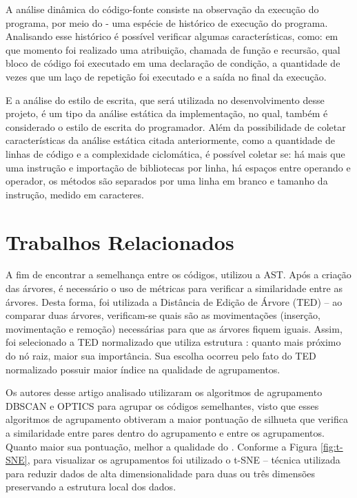		A análise dinâmica do código-fonte consiste na observação da execução do programa,
		por meio do  - uma espécie de histórico de execução do programa. Analisando
		esse histórico é possível verificar algumas características, como: em que momento foi
		realizado uma atribuição, chamada de função e recursão, qual bloco de código foi
		executado em uma declaração de condição, a quantidade de vezes que um laço de repetição
		foi executado e a saída no final da execução.
		
		E a análise do estilo de escrita, que será utilizada no desenvolvimento desse projeto,
		é um tipo da análise estática da implementação, no qual, também é considerado o estilo de
		escrita do programador. Além da possibilidade de coletar características da análise
		estática citada anteriormente, como a quantidade de linhas de código e a complexidade
		ciclomática, é possível coletar se: há mais que uma instrução e importação de bibliotecas
		por linha, há espaços entre operando e operador, os métodos são separados por uma linha
		em branco e tamanho da instrução, medido em caracteres.

	\section{Trabalhos Relacionados}
	\label{sec:TrabRel}
	
	    A fim de encontrar a semelhança entre os códigos, 
	    utilizou a AST. Após a criação das árvores,
	    é necessário o uso de métricas para verificar a similaridade entre as árvores.
	    Desta forma, foi utilizada a Distância de Edição de Árvore (TED) – ao comparar
	    duas árvores, verificam-se quais são as movimentações (inserção, movimentação
	    e remoção) necessárias para que as árvores fiquem iguais. Assim, foi
	    selecionado a TED normalizado que utiliza estrutura :
	    quanto mais próximo do nó raiz, maior sua importância. Sua escolha ocorreu
	    pelo fato do TED normalizado possuir maior índice na qualidade de agrupamentos.
	    
	    Os autores desse artigo analisado utilizaram os algoritmos de agrupamento
	    DBSCAN \cite{Ester1996} e OPTICS \cite{Ankerst1999} para agrupar os códigos
	    semelhantes, visto que esses algoritmos de agrupamento obtiveram a maior
	    pontuação de silhueta que verifica a similaridade entre pares dentro do
	    agrupamento e entre os agrupamentos. Quanto maior sua pontuação, melhor a
	    qualidade do . Conforme a Figura \ref{fig:t-SNE}, para
	    visualizar os agrupamentos foi utilizado o t-SNE \cite{maaten2008} – técnica
	    utilizada para reduzir dados de alta dimensionalidade para duas ou três
	    dimensões preservando a estrutura local dos dados.
	    
